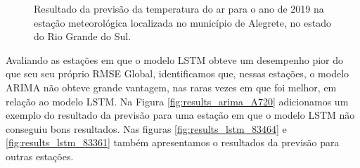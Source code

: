 \begin{figure}[H]%
\caption{Resultado da previsão da temperatura do ar para o ano de 2019 na estação meteorológica localizada no município de Alegrete, no estado do Rio Grande do Sul.}
\centering
{}
\qquad
{}
\label{fig:results_arima_A826}%
\end{figure}

Avaliando as estações em que o modelo LSTM obteve um desempenho pior do que seu seu próprio RMSE Global, identificamos que, nessas estações, o modelo ARIMA não obteve grande vantagem, nas raras vezes em que foi melhor, em relação ao modelo LSTM. Na Figura \ref{fig:results_arima_A720} adicionamos um exemplo do resultado da previsão para uma estação em que o modelo LSTM não conseguiu bons resultados. Nas figuras \ref{fig:results_lstm_83464} e \ref{fig:results_lstm_83361} também apresentamos o resultados da previsão para outras estações. 

